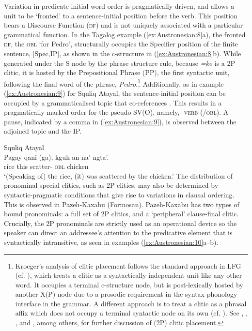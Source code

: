 \documentclass[output=paper,chinesefont]{../langscibook}
\begin{document}
Variation in predicate-initial word order is pragmatically driven, and allows a unit to be `fronted' to a sentence-initial position before the verb. This position bears a Discourse Function (\textsc{df}) and is not uniquely associated with a particular grammatical function. In the Tagalog example (\ref{ex:Austronesian:8}a), the fronted \textsc{df}, the \textsc{obl} `for Pedro', structurally occupies the Specifier position of the finite sentence, [Spec,IP], as shown in the c-structure in (\ref{ex:Austronesian:8}b). While generated under the S node by the phrase structure rule, because \emph{=ko} is a 2P clitic, it is hosted by the Prepositional Phrase (PP), the first syntactic unit, following the final word of the phrase, \emph{Pedro}.\footnote{Kroeger's analysis of clitic placement follows the standard approach in LFG (cf. \citealt[155]{BresnanEtAl2016}), which treats a clitic as a syntactically independent unit like any other word. It occupies a terminal c-structure node, but is post-lexically hosted by another X(P) node due to a prosodic requirement in the syntax-phonology interface in the grammar. A different approach is to treat a clitic as a phrasal affix which does not occupy a terminal syntactic node on its own (cf. \citealt{OConnor2002}). See \citet{Halpern95}, \citet{HalpernZwicky1996}, \citet{King2005b}, and \citet{boegel-etal2010}, among others, for further discussion of (2P) clitic placement.} Additionally, as in example (\ref{ex:Austronesian:9}) for Squliq Atayal, the sentence-initial position can be occupied by a grammaticalised topic that co-references \SUBJ. This results in a pragmatically marked order for the pseudo-SV(O), namely, \SUBJ-\textsc{verb}-(\OBJ/\textsc{obl}). A pause, indicated by a comma in (\ref{ex:Austronesian:9}), is observed between the adjoined topic and the IP.

\ea\label{ex:Austronesian:9} Squliq Atayal \citep[202]{LiuKL2017}\\
\gll
Pagay qani (ga), kguh-an na' ngta'.\\
rice this \phantom{(}{\TOPIC} scatter-{\LV} \textsc{obl} chicken\\
\glt`(Speaking of) the rice, (it) was scattered by the chicken.'
\z
The distribution of pronominal special clitics, such as 2P clitics, may also be determined by syntactic-pragmatic conditions that give rise to variations in clausal ordering. This is observed in Pazeh-Kaxabu (Formosan). Pazeh-Kaxabu has two types of bound pronominals: a full set of 2P clitics, and a `peripheral' clause-final clitic. Crucially, the 2P pronominals are strictly used as an operational device so the speaker can direct an addressee's attention to the predicative element that is syntactically intransitive, as seen in examples (\ref{ex:Austronesian:10}a--b).
\end{document}
